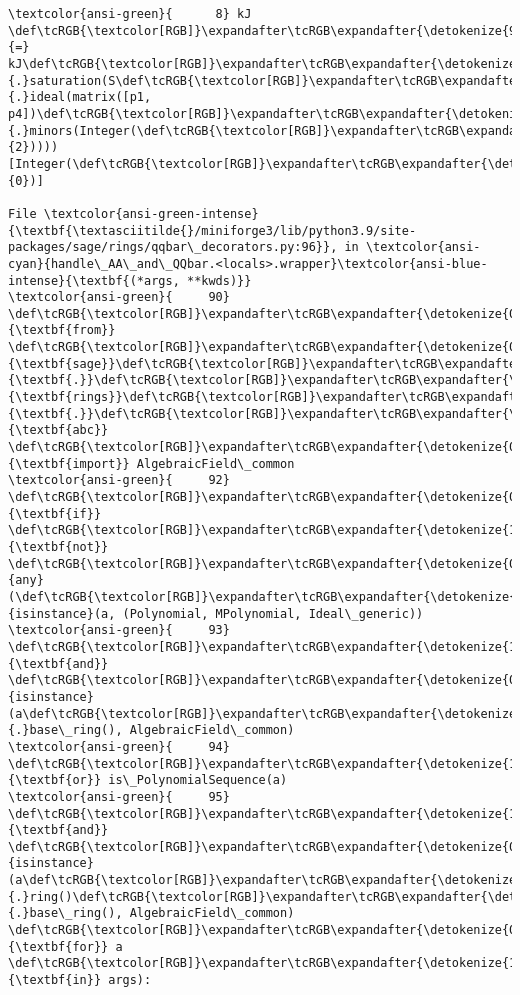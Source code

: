 \documentclass[11pt]{article}
\begin{document}
\begin{Verbatim}[commandchars=\\\{\}, frame=single, framerule=2mm, rulecolor=\color{outerrorbackground}]
\textcolor{ansi-green}{      8} kJ \def\tcRGB{\textcolor[RGB]}\expandafter\tcRGB\expandafter{\detokenize{98,98,98}}{=} kJ\def\tcRGB{\textcolor[RGB]}\expandafter\tcRGB\expandafter{\detokenize{98,98,98}}{.}saturation(S\def\tcRGB{\textcolor[RGB]}\expandafter\tcRGB\expandafter{\detokenize{98,98,98}}{.}ideal(matrix([p1, p4])\def\tcRGB{\textcolor[RGB]}\expandafter\tcRGB\expandafter{\detokenize{98,98,98}}{.}minors(Integer(\def\tcRGB{\textcolor[RGB]}\expandafter\tcRGB\expandafter{\detokenize{98,98,98}}{2}))))[Integer(\def\tcRGB{\textcolor[RGB]}\expandafter\tcRGB\expandafter{\detokenize{98,98,98}}{0})]

File \textcolor{ansi-green-intense}{\textbf{\textasciitilde{}/miniforge3/lib/python3.9/site-packages/sage/rings/qqbar\_decorators.py:96}}, in \textcolor{ansi-cyan}{handle\_AA\_and\_QQbar.<locals>.wrapper}\textcolor{ansi-blue-intense}{\textbf{(*args, **kwds)}}
\textcolor{ansi-green}{     90} \def\tcRGB{\textcolor[RGB]}\expandafter\tcRGB\expandafter{\detokenize{0,135,0}}{\textbf{from}} \def\tcRGB{\textcolor[RGB]}\expandafter\tcRGB\expandafter{\detokenize{0,0,255}}{\textbf{sage}}\def\tcRGB{\textcolor[RGB]}\expandafter\tcRGB\expandafter{\detokenize{0,0,255}}{\textbf{.}}\def\tcRGB{\textcolor[RGB]}\expandafter\tcRGB\expandafter{\detokenize{0,0,255}}{\textbf{rings}}\def\tcRGB{\textcolor[RGB]}\expandafter\tcRGB\expandafter{\detokenize{0,0,255}}{\textbf{.}}\def\tcRGB{\textcolor[RGB]}\expandafter\tcRGB\expandafter{\detokenize{0,0,255}}{\textbf{abc}} \def\tcRGB{\textcolor[RGB]}\expandafter\tcRGB\expandafter{\detokenize{0,135,0}}{\textbf{import}} AlgebraicField\_common
\textcolor{ansi-green}{     92} \def\tcRGB{\textcolor[RGB]}\expandafter\tcRGB\expandafter{\detokenize{0,135,0}}{\textbf{if}} \def\tcRGB{\textcolor[RGB]}\expandafter\tcRGB\expandafter{\detokenize{175,0,255}}{\textbf{not}} \def\tcRGB{\textcolor[RGB]}\expandafter\tcRGB\expandafter{\detokenize{0,135,0}}{any}(\def\tcRGB{\textcolor[RGB]}\expandafter\tcRGB\expandafter{\detokenize{0,135,0}}{isinstance}(a, (Polynomial, MPolynomial, Ideal\_generic))
\textcolor{ansi-green}{     93}            \def\tcRGB{\textcolor[RGB]}\expandafter\tcRGB\expandafter{\detokenize{175,0,255}}{\textbf{and}} \def\tcRGB{\textcolor[RGB]}\expandafter\tcRGB\expandafter{\detokenize{0,135,0}}{isinstance}(a\def\tcRGB{\textcolor[RGB]}\expandafter\tcRGB\expandafter{\detokenize{98,98,98}}{.}base\_ring(), AlgebraicField\_common)
\textcolor{ansi-green}{     94}            \def\tcRGB{\textcolor[RGB]}\expandafter\tcRGB\expandafter{\detokenize{175,0,255}}{\textbf{or}} is\_PolynomialSequence(a)
\textcolor{ansi-green}{     95}            \def\tcRGB{\textcolor[RGB]}\expandafter\tcRGB\expandafter{\detokenize{175,0,255}}{\textbf{and}} \def\tcRGB{\textcolor[RGB]}\expandafter\tcRGB\expandafter{\detokenize{0,135,0}}{isinstance}(a\def\tcRGB{\textcolor[RGB]}\expandafter\tcRGB\expandafter{\detokenize{98,98,98}}{.}ring()\def\tcRGB{\textcolor[RGB]}\expandafter\tcRGB\expandafter{\detokenize{98,98,98}}{.}base\_ring(), AlgebraicField\_common) \def\tcRGB{\textcolor[RGB]}\expandafter\tcRGB\expandafter{\detokenize{0,135,0}}{\textbf{for}} a \def\tcRGB{\textcolor[RGB]}\expandafter\tcRGB\expandafter{\detokenize{175,0,255}}{\textbf{in}} args):

\end{Verbatim}
\end{document}

